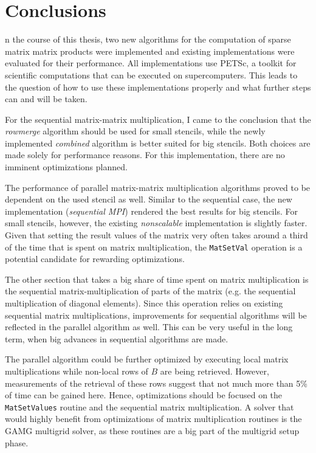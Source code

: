 \chapter*{\vspace*{-20mm}Conclusions}


n the course of this thesis, two new algorithms for the computation of sparse matrix matrix products were implemented and existing implementations were evaluated for their performance. All implementations use PETSc, a toolkit for scientific computations that can be executed on supercomputers. This leads to the question of how to use these implementations properly and what further steps can and will be taken. 

For the sequential matrix-matrix multiplication, I came to the conclusion that the \textit{rowmerge} algorithm should be used for small stencils, while the newly implemented \textit{combined} algorithm is better suited for big stencils. Both choices are made solely for performance reasons. For this implementation, there are no imminent optimizations planned. 

The performance of parallel matrix-matrix multiplication algorithms proved to be dependent on the used stencil as well. Similar to the sequential case, the new implementation (\textit{sequential MPI}) rendered the best results for big stencils. %
For small stencils, however, the existing \textit{nonscalable} implementation is slightly faster. Given that setting the result values of the matrix very often takes around a third of the time that is spent on matrix multiplication, the \texttt{MatSetVal} operation is a potential candidate for rewarding optimizations. 

The other section that takes a big share of time spent on matrix multiplication is the sequential matrix-multiplication of parts of the matrix (e.g. the sequential multiplication of diagonal elements). Since this operation relies on existing sequential matrix multiplications, improvements for sequential algorithms will be reflected in the parallel algorithm as well. This can be very useful in the long term, when big advances in sequential algorithms are made.

The parallel algorithm could be further optimized by executing local matrix multiplications while non-local rows of $B$ are being retrieved. However, measurements of the retrieval of these rows suggest that not much more than 5\% of time can be gained here. Hence, optimizations should be focused on the \texttt{MatSetValues} routine and the sequential matrix multiplication. A solver that would highly benefit from optimizations of matrix multiplication routines is the GAMG multigrid solver, as these routines are a big part of the multigrid setup phase.

